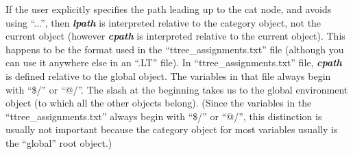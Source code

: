\documentclass[11pt]{article}
\begin{document}
If the user explicitly specifies the path leading up to the cat node, and avoids using ``...'', then \textit{\textbf{lpath}} is interpreted relative to the category object, not the current object (however \textit{\textbf{cpath}} is interpreted relative to the current object). This happens to be the format used in the ``ttree\_assignments.txt'' file (although you can use it anywhere else in an ``.LT'' file).  In ``ttree\_assignments.txt'' file, \textit{\textbf{cpath}} is defined relative to the global object. The variables in that file always begin with ``\$/'' or ``@/''.  The slash at the beginning takes us to the global environment object (to which all the other objects belong).  (Since the variables in the ``ttree\_assignments.txt'' always begin with ``\$/'' or ``@/'', this distinction is usually not important because the category object for most variables usually is the ``global'' root object.)




\end{document}
